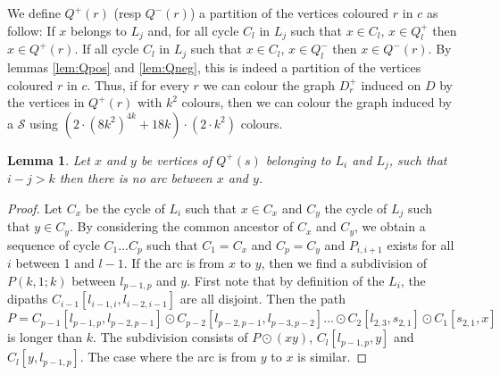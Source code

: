 \documentclass[utf8,11pt]{article}
\theoremstyle{plain}
\newtheorem{lemma}[theorem]{Lemma}
\theoremstyle{definition}
\theoremstyle{remark}
\newcommand{\dr}{ k^2}
\newcommand{\col}{(8k^2)^{4k}}
\begin{document}
%
We define $Q^+(r)$ (resp $Q^-(r)$) a partition of the vertices coloured $r$ in $c$ as follow:
If $x$ belongs to $L_j$ and, for all cycle $C_l$ in $L_j$ such that $x \in C_l$, $x \in Q^+_l$ then $x \in Q^+(r)$.
If all cycle $C_l$ in $L_j$ such that $x \in C_l$, $x \in Q^-_l$ then $x \in Q^-(r)$.
By lemmas \ref{lem:Qpos} and \ref{lem:Qneg}, this is indeed a partition of the vertices coloured $r$ in $c$.
Thus, if for every $r$ we can colour the graph $D_r^+$ induced on $D$ by the vertices in 
$Q^+(r)$ with $\dr$ colours, then we can colour the graph induced by a $\mathcal{S}$ using 
$(2\cdot \col + 18k) \cdot (2 \cdot \dr)$ colours.  


\begin{lemma}\label{lem:lvl}
Let $x$ and $y$ be vertices of $Q^+(s)$ belonging to $L_i$ and $L_j$, such that $i-j> k$ then there is no arc between $x$ and $y$.
\end{lemma}

\begin{proof}
Let $C_x$ be the cycle of $L_i$ such that $x \in C_x$ and $C_y$ the cycle of $L_j$ such that $y \in C_y$.
By considering the common ancestor of $C_x$ and $C_y$, we obtain a sequence of cycle $C_1 \dots C_p$ such that $C_1 = C_x$ and $C_p = C_y$
and $P_{i,i+1}$ exists for all $i$ between 1 and $l-1$.
If the arc is from $x$ to $y$, then we find a subdivision of $P(k,1;k)$ between $l_{p-1,p}$ and $y$. 
First note that by definition of the $L_i$, the dipaths $C_{i-1}[l_{i-1,i}, l_{i-2,i-1}]$ are all disjoint. 
Then the path $P = C_{p-1}[l_{p-1,p}, l_{p-2,p-1}] \odot C_{p-2}[l_{p-2,p-1}, l_{p-3,p-2}] \dots \odot C_{2}[l_{2,3}, s_{2,1}] 
\odot C_1[s_{2,1}, x]$ is longer than $k$. The subdivision consists of $P \odot (xy)$, $C_l[l_{p-1,p}, y]$ and $C_l[y,l_{p-1,p}]$.
The case where the arc is from $y$ to $x$ is similar.
\end{proof}
\end{document}
